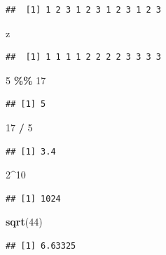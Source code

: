 \documentclass[
]{article}
\newenvironment{Shaded}{\begin{snugshade}}{\end{snugshade}}
\newcommand{\DecValTok}[1]{\textcolor[rgb]{0.00,0.00,0.81}{#1}}
\newcommand{\FunctionTok}[1]{\textcolor[rgb]{0.13,0.29,0.53}{\textbf{#1}}}
\newcommand{\NormalTok}[1]{#1}
\newcommand{\SpecialCharTok}[1]{\textcolor[rgb]{0.81,0.36,0.00}{\textbf{#1}}}
\begin{document}
\begin{verbatim}
##  [1] 1 2 3 1 2 3 1 2 3 1 2 3
\end{verbatim}

\begin{Shaded}
\begin{Highlighting}[]
\NormalTok{z}
\end{Highlighting}
\end{Shaded}

\begin{verbatim}
##  [1] 1 1 1 1 2 2 2 2 3 3 3 3
\end{verbatim}

\begin{Shaded}
\begin{Highlighting}[]
\DecValTok{5} \SpecialCharTok{\%\%} \DecValTok{17}
\end{Highlighting}
\end{Shaded}

\begin{verbatim}
## [1] 5
\end{verbatim}

\begin{Shaded}
\begin{Highlighting}[]
\DecValTok{17} \SpecialCharTok{/} \DecValTok{5}
\end{Highlighting}
\end{Shaded}

\begin{verbatim}
## [1] 3.4
\end{verbatim}

\begin{Shaded}
\begin{Highlighting}[]
\DecValTok{2}\SpecialCharTok{\^{}}\DecValTok{10}
\end{Highlighting}
\end{Shaded}

\begin{verbatim}
## [1] 1024
\end{verbatim}

\begin{Shaded}
\begin{Highlighting}[]
\FunctionTok{sqrt}\NormalTok{(}\DecValTok{44}\NormalTok{)}
\end{Highlighting}
\end{Shaded}

\begin{verbatim}
## [1] 6.63325
\end{verbatim}
\end{document}
